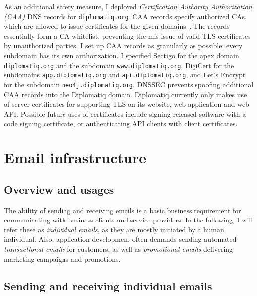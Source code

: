 As an additional safety measure, I deployed \emph{Certification Authority Authorization (CAA)} DNS records for \lstinline{diplomatiq.org}. CAA records specify authorized CAs, which are allowed to issue certificates for the given domains~\cite{rfc8659}. The records essentially form a CA whitelist, preventing the mis-issue of valid TLS certificates by unauthorized parties. I set up CAA records as granularly as possible: every subdomain has its own authorization. I specified Sectigo for the apex domain \lstinline{diplomatiq.org} and the subdomain \lstinline{www.diplomatiq.org}, DigiCert for the subdomains \lstinline{app.diplomatiq.org} and \lstinline{api.diplomatiq.org}, and Let's Encrypt for the subdomain \lstinline{neo4j.diplomatiq.org}. DNSSEC prevents spoofing additional CAA records into the Diplomatiq domain. Diplomatiq currently only makes use of server certificates for supporting TLS on its website, web application and web API. Possible future uses of certificates include signing released software with a code signing certificate, or authenticating API clients with client certificates.

\section{Email infrastructure}

\subsection{Overview and usages}

The ability of sending and receiving emails is a basic business requirement for communicating with business clients and service providers. In the following, I will refer these as \emph{individual emails}, as they are mostly initiated by a human individual. Also, application development often demands sending automated \emph{transactional emails} for customers, as well as \emph{promotional emails} delivering marketing campaigns and promotions.

\subsection{Sending and receiving individual emails}


